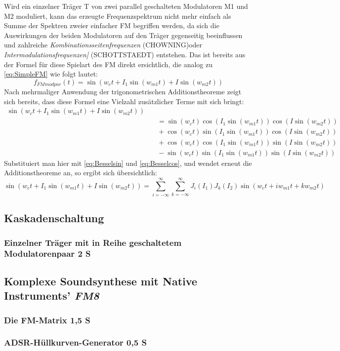 Wird ein einzelner Träger T von zwei parallel geschalteten Modulatoren M1 und M2 moduliert, kann das erzeugte Frequenzspektrum nicht mehr einfach als Summe der Spektren zweier einfacher FM begriffen werden, da sich die Auswirkungen der beiden Modulatoren auf den Träger gegenseitig beeinflussen und zahlreiche \textit{Kombinationsseitenfrequenzen} (CHOWNING)oder \textit{Intermodulationsfrequenzen]} (SCHOTTSTAEDT) entstehen. Das ist bereits aus der Formel für diese Spielart des FM direkt ersichtlich, die analog zu \ref{eq:SimpleFM} wie folgt lautet:
\begin{equation}
f_{FMmodpar}(t) = \sin(w_ct + I_1\sin(w_{m1}t) + I\sin(w_{m2}t))
\end{equation}
Nach mehrmaliger Anwendung der trigonometrischen Additionstheoreme zeigt sich bereits, dass diese Formel eine Vielzahl zusätzlicher Terme mit sich bringt:
\begin{equation}
\begin{split}
\sin(w_ct + I_1\sin(w_{m1}t) + I\sin(w_{m2}t)) \\ &\quad = \sin(w_ct)\cos(I_1\sin(w_{m1}t))\cos(I\sin(w_{m2}t)) \\ &\quad + \cos(w_ct)\sin(I_1\sin(w_{m1}t))\cos(I\sin(w_{m2}t)) \\ &\quad +\cos(w_ct)\cos(I_1\sin(w_{m1}t))\sin(I\sin(w_{m2}t)) \\ &\quad -\sin(w_ct)\sin(I_1\sin(w_{m1}t))\sin(I\sin(w_{m2}t))
\end{split}
\end{equation}
Substituiert man hier mit \ref{eq:Besselsin} und \ref{eq:Besselcos}, und wendet erneut die Additionstheoreme an, so ergibt sich übersichtlich:
\begin{equation}
\sin(w_ct + I_1\sin(w_{m1}t) + I\sin(w_{m2}t)) = \sum_{i=-\infty}^{\infty}\sum_{k=-\infty}^{\infty}J_i(I_1)J_k(I_2)\sin(w_ct + iw_{m1}t + kw_{m2}t)
\end{equation}



\subsection{Kaskadenschaltung}

\subsubsection{Einzelner Träger mit in Reihe geschaltetem Modulatorenpaar 2 S}

\subsection{Komplexe Soundsynthese mit Native Instruments' \textit{FM8}}

\subsubsection{Die FM-Matrix 1,5 S}


\subsubsection{ADSR-Hüllkurven-Generator 0,5 S}
